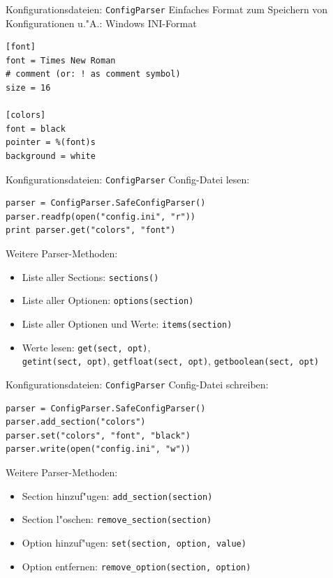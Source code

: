\begin{frame}[fragile]{Konfigurationsdateien: \texttt{ConfigParser}}
Einfaches Format zum Speichern von Konfigurationen u."A.: Windows INI-Format
\begin{lstlisting}[style=Python]
[font]
font = Times New Roman
# comment (or: ! as comment symbol)
size = 16

[colors]
font = black
pointer = %(font)s
background = white
\end{lstlisting}
\end{frame}

\begin{frame}[fragile]{Konfigurationsdateien: \texttt{ConfigParser}}
Config-Datei lesen:
\begin{lstlisting}[style=Python]
parser = ConfigParser.SafeConfigParser()
parser.readfp(open("config.ini", "r"))
print parser.get("colors", "font")
\end{lstlisting}
Weitere Parser-Methoden:
\begin{itemize}
\item Liste aller Sections: \texttt{sections()}
\item Liste aller Optionen: \texttt{options(section)}
\item Liste aller Optionen und Werte: \texttt{items(section)}
\item Werte lesen: \texttt{get(sect, opt)}, \\
\texttt{getint(sect, opt)}, \texttt{getfloat(sect, opt)}, \texttt{getboolean(sect, opt)}
\end{itemize}
\end{frame}

\begin{frame}[fragile]{Konfigurationsdateien: \texttt{ConfigParser}}
Config-Datei schreiben:
\begin{lstlisting}[style=Python]
parser = ConfigParser.SafeConfigParser()
parser.add_section("colors")
parser.set("colors", "font", "black")
parser.write(open("config.ini", "w"))
\end{lstlisting}
Weitere Parser-Methoden:
\begin{itemize}
\item Section hinzuf"ugen: \texttt{add\_section(section)}
\item Section l"oschen: \texttt{remove\_section(section)}
\item Option hinzuf"ugen: \texttt{set(section, option, value)}
\item Option entfernen: \texttt{remove\_option(section, option)}
\end{itemize}
\end{frame}


